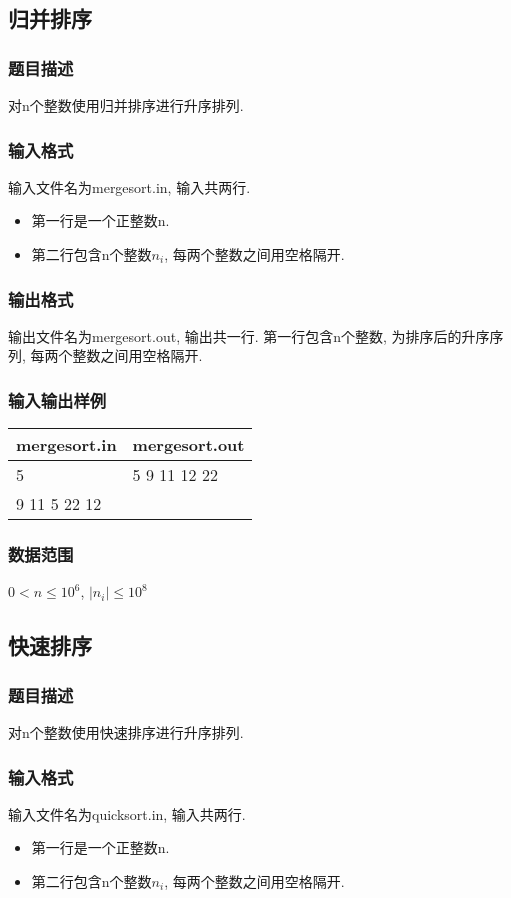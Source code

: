\subsection{归并排序}
\subsubsection{题目描述}
对n个整数使用归并排序进行升序排列.
\subsubsection{输入格式}
输入文件名为mergesort.in, 输入共两行.
\begin{itemize}
	\item 第一行是一个正整数n.
	\item 第二行包含n个整数$n_i$, 每两个整数之间用空格隔开.
\end{itemize}
\subsubsection{输出格式}
输出文件名为mergesort.out, 输出共一行.
第一行包含n个整数, 为排序后的升序序列, 每两个整数之间用空格隔开.
\subsubsection{输入输出样例}
\begin{table}[h!]
	\centering
	\begin{tabular}{|l|l|}
		\hline
		mergesort.in & mergesort.out \\
		\hline
		5            & 5 9 11 12 22  \\
		9 11 5 22 12 & ~             \\
		\hline
	\end{tabular}
\end{table}
\subsubsection{数据范围}
$ 0 < n \leq 10^6 $,
$ | n_i | \leq 10^8 $

\subsection{快速排序}
\subsubsection{题目描述}
对n个整数使用快速排序进行升序排列.
\subsubsection{输入格式}
输入文件名为quicksort.in, 输入共两行.
\begin{itemize}
	\item 第一行是一个正整数n.
	\item 第二行包含n个整数$n_i$, 每两个整数之间用空格隔开.
\end{itemize}
